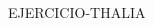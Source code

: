 

  
 \begin{multicols}{2}
    \begin{excercise}[][][]{}{
           EJERCICIO-THALIA
        }
    \end{excercise}
 \end{multicols}
